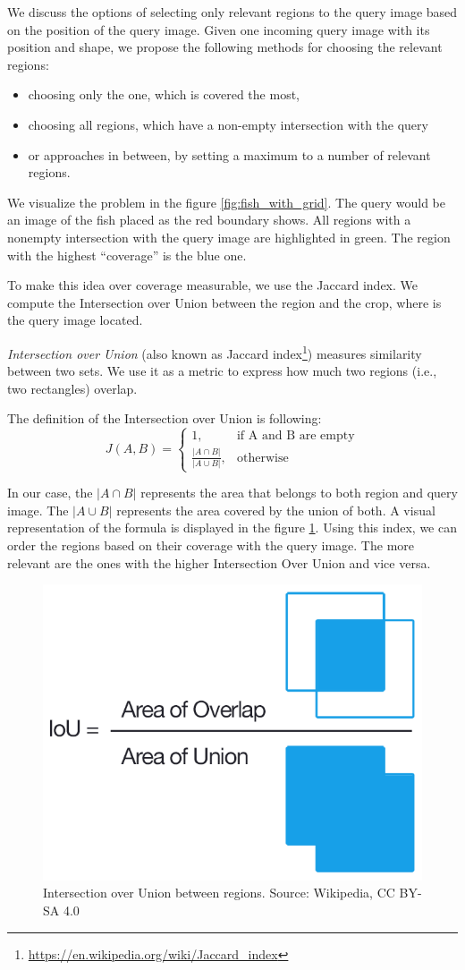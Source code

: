 We discuss the options of selecting only relevant regions to the query image based on the position of the query image. Given one incoming query image with its position and shape, we propose the following methods for choosing the relevant regions:
\begin{itemize}
  \item choosing only the one, which is covered the most,
  \item choosing all regions, which have a non-empty intersection with the query
  \item or approaches in between, by setting a maximum to a number of relevant regions.
\end{itemize}

We visualize the problem in the figure \ref{fig:fish_with_grid}. The query would be an image of the fish placed as the red boundary shows. All regions with a nonempty intersection with the query image are highlighted in green. The region with the highest ``coverage'' is the blue one.

To make this idea over coverage measurable, we use the Jaccard index. We compute the Intersection over Union between the region and the crop, where is the query image located. 

\emph{Intersection over Union} (also known as Jaccard index\footnote{\href{https://en.wikipedia.org/wiki/Jaccard_index}{https://en.wikipedia.org/wiki/Jaccard\_index}}) measures similarity between two sets. We use it as a metric to express how much two regions (i.e., two rectangles) overlap. 

The definition of the Intersection over Union is following:
$$
    J(A, B) = 
    \begin{cases}
      1, & \text{if\ A and B are empty} \\
      \frac{|A \cap B|}{|A \cup B|}, & \text{otherwise}
    \end{cases}
$$

In our case, the $|A \cap B|$ represents the area that belongs to both region and query image. The  $|A \cup B|$ represents the area covered by the union of both. A visual representation of the formula is displayed in the figure \ref{fig:intersection_over_union}. Using this index, we can order the regions based on their coverage with the query image. The more relevant are the ones with the higher Intersection Over Union and vice versa.

\begin{figure}
    \centering
	\includegraphics[width=0.3\linewidth]{img/Intersection_over_Union_-_visual_equation.png}
	\caption{Intersection over Union between regions. Source: Wikipedia, CC BY-SA 4.0}
	\label{fig:intersection_over_union}
\end{figure}

